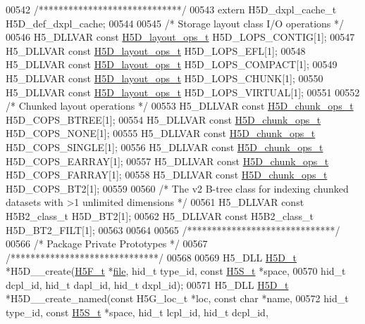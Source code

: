 \begin{DoxyCode}
00542 \textcolor{comment}{/*****************************/}
00543 \textcolor{keyword}{extern} H5D\_dxpl\_cache\_t H5D\_def\_dxpl\_cache;
00544 
00545 \textcolor{comment}{/* Storage layout class I/O operations */}
00546 H5\_DLLVAR \textcolor{keyword}{const} \hyperlink{struct_h5_d__layout__ops__t}{H5D\_layout\_ops\_t} H5D\_LOPS\_CONTIG[1];
00547 H5\_DLLVAR \textcolor{keyword}{const} \hyperlink{struct_h5_d__layout__ops__t}{H5D\_layout\_ops\_t} H5D\_LOPS\_EFL[1];
00548 H5\_DLLVAR \textcolor{keyword}{const} \hyperlink{struct_h5_d__layout__ops__t}{H5D\_layout\_ops\_t} H5D\_LOPS\_COMPACT[1];
00549 H5\_DLLVAR \textcolor{keyword}{const} \hyperlink{struct_h5_d__layout__ops__t}{H5D\_layout\_ops\_t} H5D\_LOPS\_CHUNK[1];
00550 H5\_DLLVAR \textcolor{keyword}{const} \hyperlink{struct_h5_d__layout__ops__t}{H5D\_layout\_ops\_t} H5D\_LOPS\_VIRTUAL[1];
00551 
00552 \textcolor{comment}{/* Chunked layout operations */}
00553 H5\_DLLVAR \textcolor{keyword}{const} \hyperlink{struct_h5_d__chunk__ops__t}{H5D\_chunk\_ops\_t} H5D\_COPS\_BTREE[1];
00554 H5\_DLLVAR \textcolor{keyword}{const} \hyperlink{struct_h5_d__chunk__ops__t}{H5D\_chunk\_ops\_t} H5D\_COPS\_NONE[1];
00555 H5\_DLLVAR \textcolor{keyword}{const} \hyperlink{struct_h5_d__chunk__ops__t}{H5D\_chunk\_ops\_t} H5D\_COPS\_SINGLE[1];
00556 H5\_DLLVAR \textcolor{keyword}{const} \hyperlink{struct_h5_d__chunk__ops__t}{H5D\_chunk\_ops\_t} H5D\_COPS\_EARRAY[1];
00557 H5\_DLLVAR \textcolor{keyword}{const} \hyperlink{struct_h5_d__chunk__ops__t}{H5D\_chunk\_ops\_t} H5D\_COPS\_FARRAY[1];
00558 H5\_DLLVAR \textcolor{keyword}{const} \hyperlink{struct_h5_d__chunk__ops__t}{H5D\_chunk\_ops\_t} H5D\_COPS\_BT2[1];
00559 
00560 \textcolor{comment}{/* The v2 B-tree class for indexing chunked datasets with >1 unlimited dimensions */}
00561 H5\_DLLVAR \textcolor{keyword}{const} H5B2\_class\_t H5D\_BT2[1];
00562 H5\_DLLVAR \textcolor{keyword}{const} H5B2\_class\_t H5D\_BT2\_FILT[1];
00563 
00564 
00565 \textcolor{comment}{/******************************/}
00566 \textcolor{comment}{/* Package Private Prototypes */}
00567 \textcolor{comment}{/******************************/}
00568 
00569 H5\_DLL \hyperlink{struct_h5_d__t}{H5D\_t} *H5D\_\_create(\hyperlink{struct_h5_f__t}{H5F\_t} *\hyperlink{structfile}{file}, hid\_t type\_id, \textcolor{keyword}{const} \hyperlink{struct_h5_s__t}{H5S\_t} *space,
00570     hid\_t dcpl\_id, hid\_t dapl\_id, hid\_t dxpl\_id);
00571 H5\_DLL \hyperlink{struct_h5_d__t}{H5D\_t} *H5D\_\_create\_named(\textcolor{keyword}{const} H5G\_loc\_t *loc, \textcolor{keyword}{const} \textcolor{keywordtype}{char} *name,
00572     hid\_t type\_id, \textcolor{keyword}{const} \hyperlink{struct_h5_s__t}{H5S\_t} *space, hid\_t lcpl\_id, hid\_t dcpl\_id,

\end{DoxyCode}
